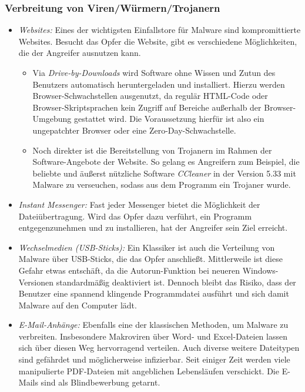 \subsubsection{Verbreitung von Viren/Würmern/Trojanern}
\label{sec:VerbreitungVirenWuermerTrojaner}

\begin{itemize}
	\item \textit{Websites:} Eines der wichtigsten Einfallstore für Malware sind kompromittierte Websites. Besucht das Opfer die Website, gibt es verschiedene Möglichkeiten, die der Angreifer ausnutzen kann.
	\begin{itemize}
		\item Via \textit{Drive-by-Downloads} wird Software ohne Wissen und Zutun des Benutzers automatisch heruntergeladen und installiert. Hierzu werden Browser-Schwachstellen ausgenutzt, da regulär HTML-Code oder Browser-Skriptsprachen kein Zugriff auf Bereiche außerhalb der Browser-Umgebung gestattet wird. Die Voraussetzung hierfür ist also ein ungepatchter Browser oder eine Zero-Day-Schwachstelle.
		\item Noch direkter ist die Bereitstellung von Trojanern im Rahmen der Software-Angebote der Website. So gelang es Angreifern zum Beispiel, die beliebte und äußerst nützliche Software \textit{CCleaner} in der Version 5.33 mit Malware zu verseuchen, sodass aus dem Programm ein Trojaner wurde.
	\end{itemize}
	\item \textit{Instant Messenger:} Fast jeder Messenger bietet die Möglichkeit der Dateiübertragung. Wird das Opfer dazu verführt, ein Programm entgegenzunehmen und zu installieren, hat der Angreifer sein Ziel erreicht.
	\item \textit{Wechselmedien (USB-Sticks):} Ein Klassiker ist auch die Verteilung von Malware über USB-Sticks, die das Opfer anschließt. Mittlerweile ist diese Gefahr etwas entschäft, da die Autorun-Funktion bei neueren Windows-Versionen standardmäßig deaktiviert ist. Dennoch bleibt das Risiko, dass der Benutzer eine spannend klingende Programmdatei ausführt und sich damit Malware auf den Computer lädt.
	\item \textit{E-Mail-Anhänge:} Ebenfalls eine der klassischen Methoden, um Malware zu verbreiten. Insbesondere Makroviren über Word- und Excel-Dateien lassen sich über diesen Weg hervorragend verteilen. Auch diverse weitere Dateitypen sind gefährdet und möglicherweise infizierbar. Seit einiger Zeit werden viele manipulierte PDF-Dateien mit angeblichen Lebensläufen verschickt. Die E-Mails sind als Blindbewerbung getarnt.

\end{itemize}
